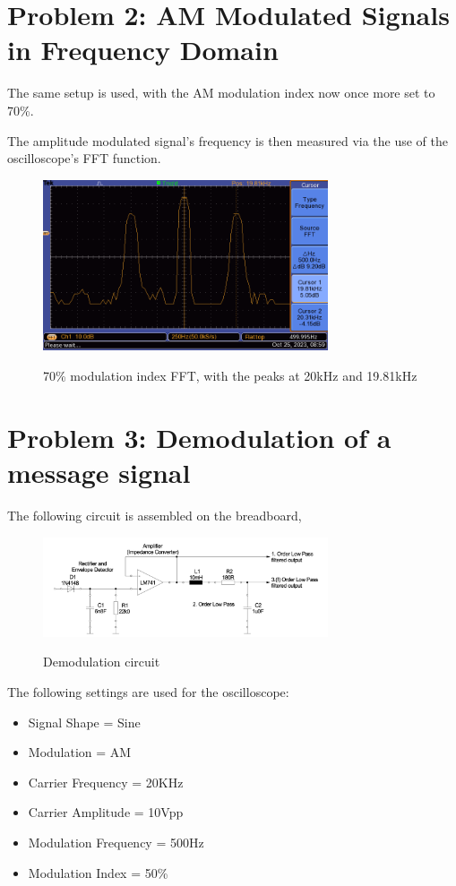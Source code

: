 \section{Problem 2: AM Modulated Signals in Frequency Domain}

The same setup is used, with the AM modulation index now once more set to 70\%.

The amplitude modulated signal's frequency is then measured via the use of the oscilloscope's FFT function.

\begin{figure}[H]
    \centering
    \includegraphics[width=0.75\textwidth]{images/execution_02_07_fft.png}
    \label{fig:execution_02_07_fft}
    \caption{70\% modulation index FFT, with the peaks at 20kHz and 19.81kHz}
\end{figure}
\newpage
\section{Problem 3: Demodulation of a message signal}

The following circuit is assembled on the breadboard,
\begin{figure}[H]
    \centering
    \includegraphics[width=0.75\textwidth]{images/execution_03_circuit.png}
    \label{fig:execution_03_circuit}
    \caption{Demodulation circuit}
\end{figure}

The following settings are used for the oscilloscope:
\begin{itemize}
    \item Signal Shape = Sine
    \item Modulation = AM
    \item Carrier Frequency = 20KHz
    \item Carrier Amplitude = 10Vpp
    \item Modulation Frequency = 500Hz
    \item Modulation Index = 50\%
\end{itemize}

